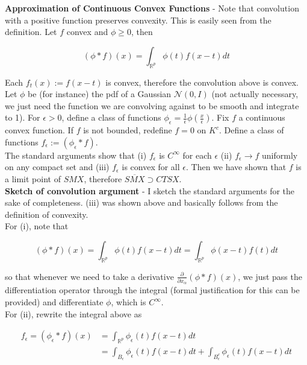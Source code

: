 \documentclass[11pt,reqno]{amsart}
\theoremstyle{definition}
\numberwithin{equation}{section}
\newcommand{\eps}{\epsilon}
\newcommand{\mc}{\mathcal}
\newcommand{\mr}{\mathbb{R}}
\newcommand{\tb}{\textbf}
\newcommand{\pa}{\partial}
\begin{document}
\tb{Approximation of Continuous Convex Functions} - Note that convolution with a positive function preserves convexity. This is easily seen from the definition. Let $f$ convex and $\phi \geq 0$, then 

\[
(\phi \ast f)(x) = \int_{\mr^p} \phi(t) f(x - t) dt 
\]

Each $f_t(x) := f(x -t)$ is convex, therefore the convolution above is convex. \\

Let $\phi$ be (for instance) the pdf of a Gaussian $\mc{N}(0,I)$ (not actually necessary, we just need the function we are convolving against to be smooth and integrate to 1). For $\eps > 0$, define a class of functions $\phi_{\eps} = \frac{1}{\eps} \phi(\frac{x}{\eps})$. Fix $f$ a continuous convex function. If $f$ is not bounded, redefine $f = 0$ on $K^c$.  Define a class of functions $f_{\eps} := (\phi_{\eps} \ast f)$.\\

The standard arguments show that (i) $f_{\eps}$ is $C^{\infty}$ for each $\eps$ (ii) $f_{\eps} \to f$ uniformly on any compact set and (iii) $f_{\eps}$ is convex for all $\eps$. Then we have shown that $f$ is a limit point of $SMX$, therefore $\overline{SMX} \supset CTSX$. \\

\tb{Sketch of convolution argument} - I sketch the standard arguments for the sake of completeness. (iii) was shown above and basically follows from the definition of convexity. \\

For (i), note that 

\[
(\phi \ast f)(x) = \int_{\mr^p} \phi(t) f(x - t) dt = \int_{\mr^p} \phi(x - t) f(t) dt 
\]

so that whenever we need to take a derivative $\frac{\pa}{\pa x_{\alpha}} (\phi \ast f)(x)$, we just pass the differentiation operator through the integral (formal justification for this can be provided) and differentiate $\phi$, which is $C^{\infty}$. \\

For (ii), rewrite the integral above as 

\begin{align*}
f_{\eps} = (\phi_{\eps} \ast f)(x) &= \int_{\mr^p} \phi_{\eps}(t) f(x - t) dt\\
&=\int_{B_{\eps}} \phi_{\eps}(t) f(x - t) dt + \int_{B_{\eps}^c} \phi_{\eps}(t) f(x - t) dt
\end{align*}
\end{document}
